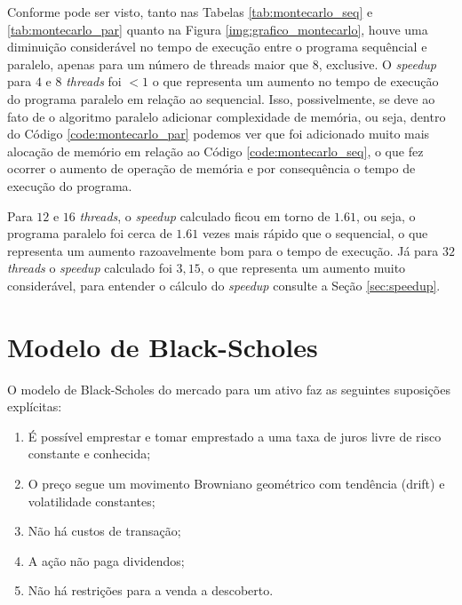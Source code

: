\documentclass[11pt,twoside]{article}
\begin{document}
    
        Conforme pode ser visto, tanto nas Tabelas \ref{tab:montecarlo_seq} e
        \ref{tab:montecarlo_par} quanto na Figura \ref{img:grafico_montecarlo}, houve
        uma diminuição considerável no tempo de execução entre o programa sequêncial e
        paralelo, apenas para um número de threads maior que $8$, exclusive.
        O {\it speedup} para $4$ e $8$ {\it threads} foi $< 1$ o que representa um
        aumento no tempo de execução do programa paralelo em relação ao sequencial. Isso,
        possivelmente, se deve ao fato de o algoritmo paralelo adicionar complexidade
        de memória, ou seja, dentro do Código \ref{code:montecarlo_par} podemos ver
        que foi adicionado muito mais alocação de memório em relação ao Código
        \ref{code:montecarlo_seq}, o que fez ocorrer o aumento de operação de memória
        e por consequência o tempo de execução do programa.
        
        Para $12$ e $16$ {\it threads}, o {\it speedup } calculado ficou em torno de
        $1.61$, ou seja, o programa paralelo foi cerca de $1.61$ vezes mais rápido
        que o sequencial, o que representa um aumento
        razoavelmente bom para o tempo de execução. Já para $32$ {\it threads} o {\it speedup}
        calculado foi $3,15$, o que representa um aumento muito considerável, para entender o
        cálculo do {\it speedup} consulte a Seção \ref{sec:speedup}.

\section{Modelo de Black-Scholes}

    O modelo de Black-Scholes do mercado para um ativo faz as seguintes suposições explícitas:
    
    \begin{enumerate}
        \item É possível emprestar e tomar emprestado a uma taxa de juros livre de risco
            constante e conhecida;
        \item O preço segue um movimento Browniano geométrico com tendência (drift) e 
            volatilidade constantes;
        \item Não há custos de transação;
        \item A ação não paga dividendos;
        \item Não há restrições para a venda a descoberto.
    \end{enumerate}
\end{document}
